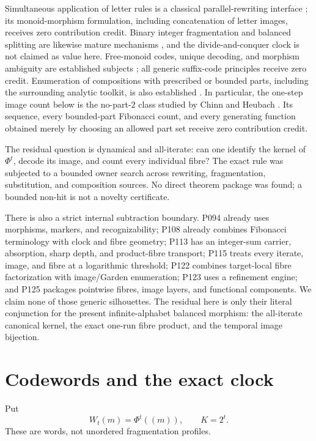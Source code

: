 \documentclass[10pt,a4paper]{amsart}
\theoremstyle{definition}
\theoremstyle{remark}
\begin{document}
Simultaneous application of letter rules is a classical parallel-rewriting
interface \cite{LindenmayerRozenberg1972}; its monoid-morphism formulation,
including concatenation of letter images, receives zero contribution credit.
Binary integer fragmentation and balanced splitting are likewise mature
mechanisms \cite{Matsoukas2022}, and the divide-and-conquer clock is not
claimed as value here.  Free-monoid codes, unique decoding, and morphism
ambiguity are established subjects
\cite{BerstelPerrin1985,Honkala1987,FreydenbergerReidenbach2009}; all generic
suffix-code principles receive zero credit.  Enumeration of compositions
with prescribed or bounded parts, including the surrounding analytic
toolkit, is also established
\cite{HeubachMansour2004,Malandro2012,BanderierHitczenko2012}.  In particular,
the one-step image count below is the no-part-$2$ class studied by Chinn and
Heubach \cite{ChinnHeubach2003}.  Its sequence, every bounded-part Fibonacci
count, and every generating function obtained merely by choosing an allowed
part set receive zero contribution credit.

The residual question is dynamical and all-iterate: can one identify the
kernel of $\Phi^t$, decode its image, and count every individual fibre?
The exact rule was subjected to a bounded owner search across rewriting,
fragmentation, substitution, and composition sources.  No direct theorem
package was found; a bounded non-hit is not a novelty certificate.

There is also a strict internal subtraction boundary.  P094 already uses
morphisms, markers, and recognizability; P108 already combines Fibonacci
terminology with clock and fibre geometry; P113 has an integer-sum carrier,
absorption, sharp depth, and product-fibre transport; P115 treats every
iterate, image, and fibre at a logarithmic threshold; P122 combines
target-local fibre factorization with image/Garden enumeration; P123 uses a
refinement engine; and P125 packages pointwise fibres, image layers, and
functional components.  We claim none of those generic silhouettes.  The
residual here is only their literal conjunction for the present
infinite-alphabet balanced morphism: the all-iterate canonical kernel, the
exact one-run fibre product, and the temporal image bijection.

\section{Codewords and the exact clock}

Put
\[
                    W_t(m)=\Phi^t((m)),\qquad K=2^t.
\]
These are words, not unordered fragmentation profiles.
\end{document}
